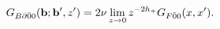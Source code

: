 \begin{equation}
G_{B\partial \bar{0} 0} ({\bf b}; {\bf b'}, z') = 2 \nu \lim_{z \rightarrow 0} z^{-2h_+} G_{F \bar{0} 0} (x,x') .
\end{equation}

